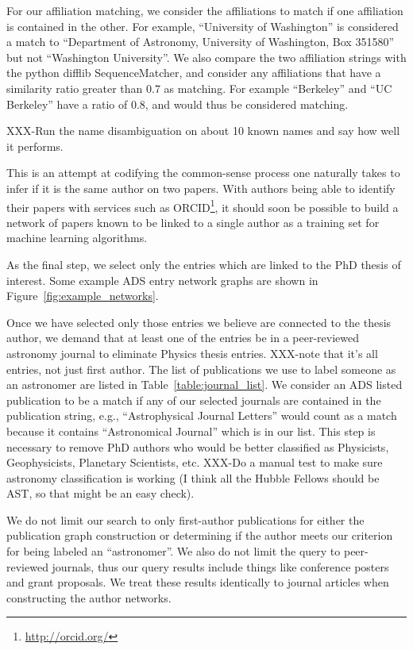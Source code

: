 \documentclass[preprint2]{aastex}
\begin{document}
For our affiliation matching, we consider the affiliations to match if one affiliation is contained in the other.  For example, ``University of Washington'' is considered a match to ``Department of Astronomy, University of Washington, Box 351580'' but not ``Washington University''.  We also compare the two affiliation strings with the python difflib SequenceMatcher, and consider any affiliations that have a similarity ratio greater than 0.7 as matching.  For example ``Berkeley'' and ``UC Berkeley'' have a ratio of 0.8, and would thus be considered matching.

XXX-Run the name disambiguation on about 10 known names and say how well it performs.

This is an attempt at codifying the common-sense process one naturally takes to infer if it is the same author on two papers. With authors being able to identify their papers with services such as ORCID\footnote{\url{http://orcid.org/}}, it should soon be possible to build a network of papers known to be linked to a single author as a training set for machine learning algorithms.  

As the final step, we select only the entries which are linked to the PhD thesis of interest.  Some example ADS entry network graphs are shown in Figure~\ref{fig:example_networks}.

Once we have selected only those entries we believe are connected to the thesis author, we demand that at least one of the entries be in a peer-reviewed astronomy journal to eliminate Physics thesis entries. XXX-note that it's all entries, not just first author. The list of publications we use to label someone as an astronomer are listed in Table~\ref{table:journal_list}. We consider an ADS listed publication to be a match if any of our selected journals are contained in the publication string, e.g., ``Astrophysical Journal Letters'' would count as a match because it contains ``Astronomical Journal'' which is in our list.  This step is necessary to remove PhD authors who would be better classified as Physicists, Geophysicists, Planetary Scientists, etc. XXX-Do a manual test to make sure astronomy classification is working (I think all the Hubble Fellows should be AST, so that might be an easy check).

We do not limit our search to only first-author publications for either the publication graph construction or determining if the author meets our criterion for being labeled an ``astronomer''. We also do not limit the query to peer-reviewed journals, thus our query results include things like conference posters and grant proposals.  We treat these results identically to journal articles when constructing the author networks. 
\end{document}
